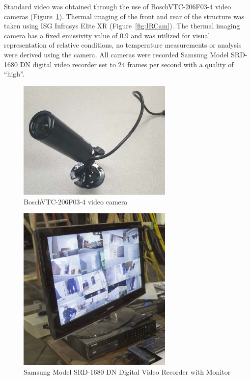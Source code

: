 \documentclass[12pt,oneside]{book}
\begin{document}
Standard video was obtained through the use of BoschVTC-206F03-4 video cameras (Figure~\ref{fig:BullettCam}). Thermal imaging of the front and rear of the structure was taken using ISG Infrasys Elite XR (Figure~\ref{fig:IRCam}). The thermal imaging camera has a fixed emissivity value of 0.9 and was utilized for visual representation of relative conditions, no temperature measurements or analysis were derived using the camera. All cameras were recorded Samsung Model SRD-1680 DN digital video recorder set to 24 frames per second with a quality of ``high''.

\begin{figure}[H]
	\centering
	\includegraphics[width = 3in]{0_Images/Instrumentation/BullettCam.jpg}

	\caption{BoschVTC-206F03-4 video camera}
	\label{fig:BullettCam}
\end{figure}

\begin{figure}[H]
	\centering
	\includegraphics[width = 3in]{0_Images/Instrumentation/DVR.jpg}

	\caption{Samsung Model SRD-1680 DN Digital Video Recorder with Monitor}
	\label{fig:DVR}
\end{figure}
\end{document}
